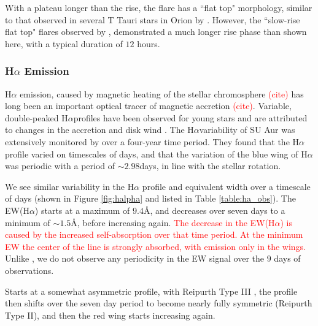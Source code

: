 \documentclass[twocolumn]{aastex631}
\newcommand\halpha{\ensuremath{{\text{H}\alpha}}}
\newcommand{\citesomething}[1]{\textcolor{red}{(cite#1)}}
\newcommand{\red}[1]{\textcolor{red}{#1}}
\begin{document}
With a plateau longer than the rise, the flare has a ``flat top" morphology, similar to that observed in several T Tauri stars in Orion by \citet{getman_x-ray_2008}. However, the ``slow-rise flat top" flares observed by \citet{getman_x-ray_2008}, demonstrated a much longer rise phase than shown here, with a typical duration of $12$ hours. 

\subsubsection{H$\alpha$ Emission} \label{sec:su_aur_halpha}
\halpha{} emission, caused by magnetic heating of the stellar chromosphere \citesomething{} has long been an important optical tracer of magnetic accretion \citesomething{}. 
Variable, double-peaked \halpha profiles have been observed for young stars and are attributed to changes in the accretion and disk wind \citep[e.g.][]{edwards_spectroscopic_1994, olson_rapid_1995, reipurth_halpha_1996, kurosawa_formation_2006}.
The \halpha variability of SU Aur was extensively monitored by \citet{giampapa_synoptic_1993} over a four-year time period. They found that the \halpha profile varied on timescales of days, and that the variation of the blue wing of \halpha{} was periodic with a period of $\sim2.98$days, in line with the stellar rotation.

We see similar variability in the \halpha{} profile and equivalent width over a timescale of days (shown in Figure \ref{fig:halpha} and listed in Table \ref{table:ha_obs}). The EW(\halpha) starts at a maximum of $9.4$\AA, and decreases over seven days to a minimum of $\sim1.5$\AA, before increasing again.
\red{The decrease in the EW(\halpha) is caused by the increased self-absorption over that time period. At the minimum EW the center of the line is strongly absorbed, with emission only in the wings.}
Unlike \citet{giampapa_synoptic_1993}, we do not observe any periodicity in the EW signal over the $9$ days of observations. %

Starts at a somewhat asymmetric profile, with Reipurth Type III \citep{reipurth_halpha_1996}, the profile then shifts over the seven day period to become nearly fully symmetric (Reipurth Type II), and then the red wing starts increasing again. 
\end{document}

